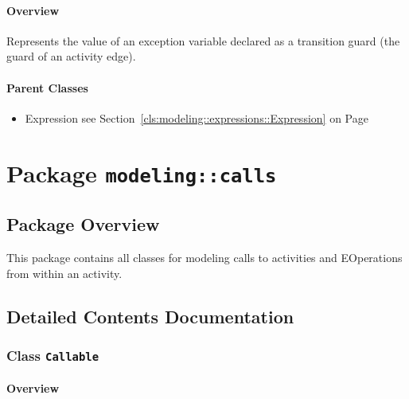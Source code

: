\paragraph{Overview}

	
			
Represents the value of an exception variable declared as a transition guard (the guard of an activity edge).	
		
	



\paragraph{Parent Classes}
\begin{itemize}
\item Expression see Section~\ref{cls:modeling::expressions::Expression} on Page~\pageref{cls:modeling::expressions::Expression}\end{itemize}
\newpage
		


\section{Package \bfseries \texttt{modeling::calls}\normalfont}
\subsection{Package Overview}
	
			
This package contains all classes for modeling calls to activities and EOperations
from within an activity.	
		
	
			
		



\subsection{Detailed Contents Documentation}
\subsubsection{\Large{Class \bfseries \texttt{Callable}\normalfont}}
\label{cls:modeling::calls::Callable} 
\paragraph{Overview}

